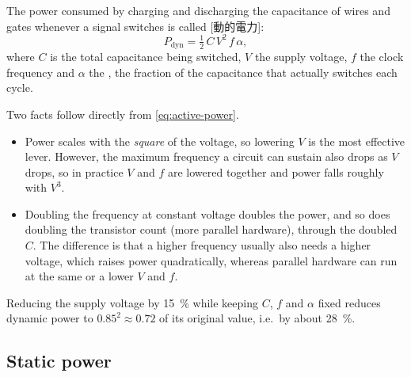 \documentclass[../main.tex]{subfiles}
\begin{document}
The power consumed by charging and discharging the capacitance of wires and
gates whenever a signal switches is called [動的電力]:
\begin{equation}
  P_{\mathrm{dyn}} = \tfrac{1}{2}\, C\, V^{2}\, f\, \alpha ,
  \label{eq:active-power}
\end{equation}
where $C$ is the total capacitance being switched, $V$ the supply voltage,
$f$ the clock frequency and $\alpha$ the , the
fraction of the capacitance that actually switches each cycle.

Two facts follow directly from \cref{eq:active-power}.
\begin{itemize}
  \item Power scales with the \emph{square} of the voltage, so lowering $V$
    is the most effective lever.  However, the maximum frequency a circuit
    can sustain also drops as $V$ drops, so in practice $V$ and $f$ are
    lowered together and power falls roughly with $V^{3}$.
  \item Doubling the frequency at constant voltage doubles the power, and
    so does doubling the transistor count (more parallel hardware), through
    the doubled $C$.  The difference is that a higher frequency usually also
    needs a higher voltage, which raises power quadratically, whereas
    parallel hardware can run at the same or a lower $V$ and
    $f$.
\end{itemize}

\begin{example}
  Reducing the supply voltage by \SI{15}{\percent} while keeping $C$, $f$ and
  $\alpha$ fixed reduces dynamic power to $0.85^{2} \approx 0.72$ of its
  original value, i.e.\ by about \SI{28}{\percent}.
\end{example}

\subsection{Static power}
\end{document}
